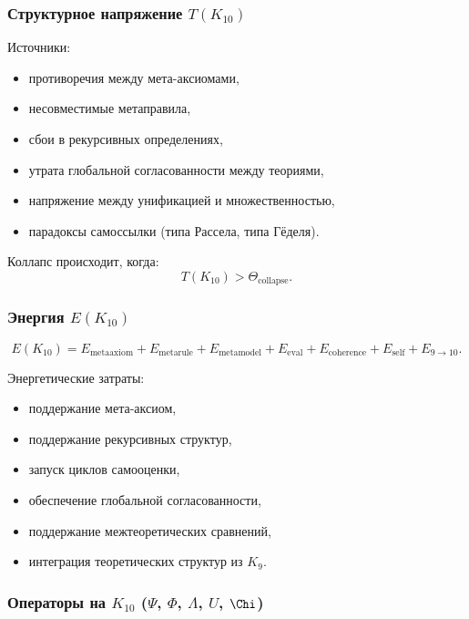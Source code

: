 \subsubsection{Структурное напряжение $T(K_{10})$}

Источники:
\begin{itemize}
    \item противоречия между мета-аксиомами,
    \item несовместимые метаправила,
    \item сбои в рекурсивных определениях,
    \item утрата глобальной согласованности между теориями,
    \item напряжение между унификацией и множественностью,
    \item парадоксы самоссылки (типа Рассела, типа Гёделя).
\end{itemize}

Коллапс происходит, когда:
\[
T(K_{10}) > \Theta_{\mathrm{collapse}}.
\]

\subsubsection{Энергия $E(K_{10})$}

\[
E(K_{10})=
E_{\mathrm{metaaxiom}}+
E_{\mathrm{metarule}}+
E_{\mathrm{metamodel}}+
E_{\mathrm{eval}}+
E_{\mathrm{coherence}}+
E_{\mathrm{self}}+
E_{9\to10}.
\]

Энергетические затраты:
\begin{itemize}
    \item поддержание мета-аксиом,
    \item поддержание рекурсивных структур,
    \item запуск циклов самооценки,
    \item обеспечение глобальной согласованности,
    \item поддержание межтеоретических сравнений,
    \item интеграция теоретических структур из $K_9$.
\end{itemize}

\subsubsection{Операторы на $K_{10}$ ($\Psi$, $\Phi$, $\Lambda$, $U$, $\Chi$)}

